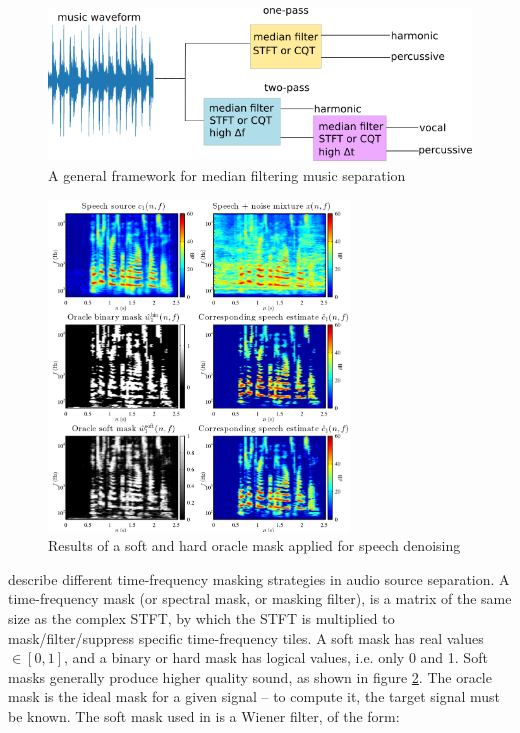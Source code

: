 \documentclass[letter,12pt]{article}
\begin{document}
\begin{figure}[ht]
	\centering
	\includegraphics[width=12cm]{./medianfiltdiagram.png}
	\caption{A general framework for median filtering music separation}
	\label{fig:fitz2}
\end{figure}

\begin{figure}
	\includegraphics[width=8cm]{./maskdemo.png}
	\caption{Results of a soft and hard oracle mask applied for speech denoising}
	\label{fig:masks}
\end{figure}

\citet{masking} describe different time-frequency masking strategies in audio source separation. A time-frequency mask (or spectral mask, or masking filter), is a matrix of the same size as the complex STFT, by which the STFT is multiplied to mask/filter/suppress specific time-frequency tiles. A soft mask has real values $\in [0, 1]$, and a binary or hard mask has logical values, i.e. only 0 and 1. Soft masks generally produce higher quality sound, as shown in figure \ref{fig:masks}. The oracle mask is the ideal mask for a given signal -- to compute it, the target signal must be known. The soft mask used in \cite{fitzgerald1, fitzgerald2} is a Wiener filter, of the form:
\end{document}
